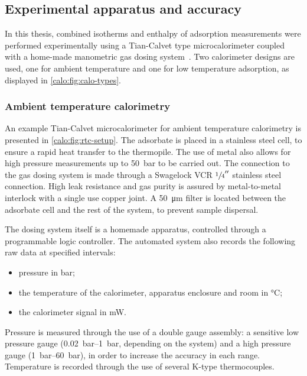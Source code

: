 \subsection{Experimental apparatus and accuracy}

In this thesis, combined isotherms and enthalpy of adsorption
measurements were performed experimentally using a Tian-Calvet type
microcalorimeter coupled with a home-made manometric gas dosing
system~\cite{llewellynGasAdsorptionMicrocalorimetry2005}.
Two calorimeter designs are used, one for ambient temperature
and one for low temperature adsorption, as displayed in
\autoref{calo:fig:calo-types}.

\subsubsection{Ambient temperature calorimetry}\label{calo:rtc}

An example Tian-Calvet microcalorimeter for ambient temperature 
calorimetry is presented in \autoref{calo:fig:rtc-setup}. The 
adsorbate is placed in a stainless steel cell, to ensure a rapid 
heat transfer to the thermopile. The use of metal also allows for 
high pressure measurements up to \SI{50}{\bar} to be carried out.
The connection to the gas dosing system is made through a 
Swagelock VCR \(\sfrac{1}{4}''\)
stainless steel connection. High leak resistance and gas purity 
is assured by metal-to-metal interlock with a single use copper joint.
A \SI{50}{\micro\metre} filter is located between the adsorbate cell 
and the rest of the system, to prevent sample dispersal.

The dosing system itself is a homemade apparatus, controlled through 
a programmable logic controller. The automated system also records 
the following raw data at specified intervals:
\begin{itemize}
	\item pressure in \si{bar};
	\item the temperature of the calorimeter, apparatus enclosure and room in \si{\degreeCelsius};
	\item the calorimeter signal in \si{\milli\watt}.
\end{itemize}
Pressure is measured through the use of a double gauge assembly:
a sensitive low pressure gauge (\SIrange{0.02}{1}{\bar},
depending on the system) and a high pressure gauge (\SIrange{1}{60}{\bar}),
in order to increase the accuracy in each range. Temperature is
recorded through the use of several K-type thermocouples.

